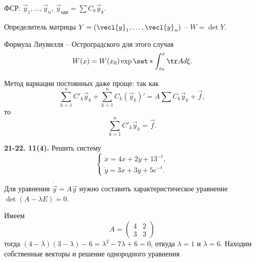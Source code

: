 ФСР: $\vec{y}_1, \ldots, \vec{y}_n$, $\vec{y}_{\text{одн}} = \sum C_k\vec{y}_k$.

Определитель матрицы $Y = (\vecl{y}_1, \ldots, \vecl{y}_n)$ -- $W = \det Y$.

Формула Лиувилля -- Остроградского для этого случая
\begin{equation*}
    W(x) = W(x_0)\exp\set*{\int_{x_0}^x \tr A d\xi}.
\end{equation*}

Метод вариации постоянных даже проще: так как 
\begin{equation*}
    \sum_{k = 1}^n C'_k\vec{y}_k + \sum_{k = 1}^n C_k(\vec{y}_k)' = A\sum C_k\vec{y}_k + \vec{f},
\end{equation*}
то
\begin{equation*}
    \sum_{k = 1}^n C'_k\vec{y}_k = \vec{f}.
\end{equation*}

\begin{task}
    \textbf{21-22. 11(4).} Решить систему
    \begin{equation*}
        \begin{cases}
            \dot{x} = 4x + 2y + 13^{-t}, \\
            \dot{y} = 3x + 3y + 5e^{-t}.
        \end{cases}
    \end{equation*}
\end{task}

Для уравнения $\dot{\vec{y}} = A\vec{y}$ нужно составить характеристическое уравнение $\det(A - \lambda E) = 0$.

Имеем
\begin{equation*}
    A = \begin{pmatrix}
        4 & 2 \\ 3 & 3
    \end{pmatrix}
\end{equation*}
тогда $(4 - \lambda)(3 - \lambda) - 6 = \lambda^2 - 7\lambda + 6 = 0$, откуда $\lambda = 1$ и $\lambda = 6$. Находим собственные векторы и решение однородного уравнения


